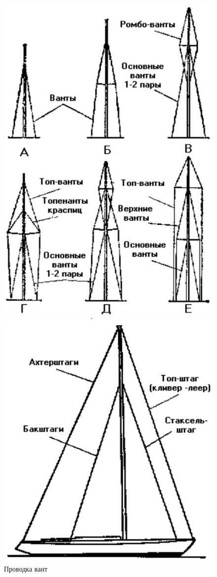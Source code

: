 \documentclass[a4paper, 12pt, twoside, final]{scrbook}
\begin{document}
\begin{figure}[htbp]
	\begin{minipage}[b]{0.49\textwidth}
		\centering\includegraphics{38_Provodka_vant}
		\caption{Проводка вант}
		\label{fig:38}
	\end{minipage}
	\hfil\hfil%
	\begin{minipage}[b]{0.49\textwidth}
		\centering\includegraphics{Provodka_shtagov}

\end{minipage}
\end{figure}
\end{document}
